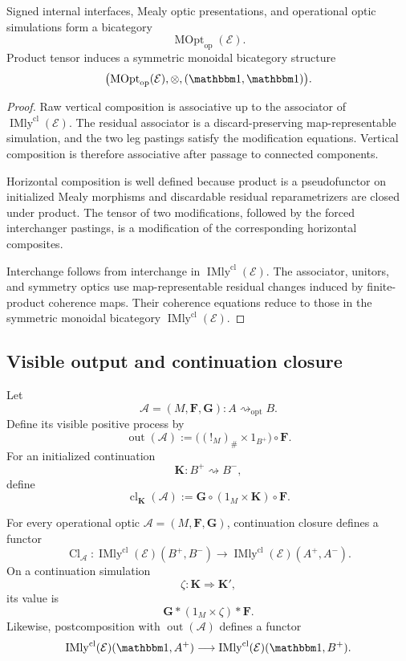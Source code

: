 \begin{theorem}
\label{thm:operational-mealy-optic-bicategory}
Signed internal interfaces, Mealy optic presentations, and operational optic simulations form a
bicategory
\[
  \operatorname{MOpt}_{\mathrm{op}}(\mathcal E).
\]
Product tensor induces a symmetric monoidal bicategory structure
\[
  \bigl(
    \operatorname{MOpt}_{\mathrm{op}}(\mathcal E),
    \otimes,
    (\mathbbm1,\mathbbm1)
  \bigr).
\]
\end{theorem}

\begin{proof}
Raw vertical composition is associative up to the associator of
\(\operatorname{IMly}^{\mathrm{cl}}(\mathcal E)\). The residual associator is a
discard-preserving map-representable simulation, and the two leg pastings satisfy the modification
equations. Vertical composition is therefore associative after passage to connected components.

Horizontal composition is well defined because product is a pseudofunctor on initialized Mealy
morphisms and discardable residual reparametrizers are closed under product. The tensor of two
modifications, followed by the forced interchanger pastings, is a modification of the corresponding
horizontal composites.

Interchange follows from interchange in
\(\operatorname{IMly}^{\mathrm{cl}}(\mathcal E)\). The associator, unitors, and symmetry optics use
map-representable residual changes induced by finite-product coherence maps. Their coherence
equations reduce to those in the symmetric monoidal bicategory
\(\operatorname{IMly}^{\mathrm{cl}}(\mathcal E)\).
\end{proof}

\subsection{Visible output and continuation closure}

Let
\[
  \mathcal A=(M,\mathbf F,\mathbf G):A\rightsquigarrow_{\mathrm{opt}}B.
\]
Define its visible positive process by
\[
  \operatorname{out}(\mathcal A)
  :=
  \bigl(
    (!_M)_\#\times1_{B^+}
  \bigr)
  \circ\mathbf F.
\]
For an initialized continuation
\[
  \mathbf K:B^+\rightsquigarrow B^-,
\]
define
\[
  \operatorname{cl}_{\mathbf K}(\mathcal A)
  :=
  \mathbf G\circ(1_M\times\mathbf K)\circ\mathbf F.
\]

\begin{lemma}
\label{lem:continuation-functoriality}
For every operational optic \(\mathcal A=(M,\mathbf F,\mathbf G)\), continuation closure defines a
functor
\[
  \operatorname{Cl}_{\mathcal A}:
  \operatorname{IMly}^{\mathrm{cl}}(\mathcal E)(B^+,B^-)
  \longrightarrow
  \operatorname{IMly}^{\mathrm{cl}}(\mathcal E)(A^+,A^-).
\]
On a continuation simulation
\[
  \zeta:\mathbf K\Longrightarrow\mathbf K',
\]
its value is
\[
  \mathbf G\ast(1_M\times\zeta)\ast\mathbf F.
\]
Likewise, postcomposition with \(\operatorname{out}(\mathcal A)\) defines a functor
\[
  \operatorname{IMly}^{\mathrm{cl}}(\mathcal E)(\mathbbm1,A^+)
  \longrightarrow
  \operatorname{IMly}^{\mathrm{cl}}(\mathcal E)(\mathbbm1,B^+).
\]
\end{lemma}

